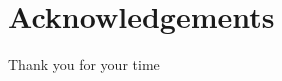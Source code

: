 \documentclass[12pt,twoside]{article}
\begin{document}


\section*{Acknowledgements}
Thank you for your time

\printbibliography
\end{document}
